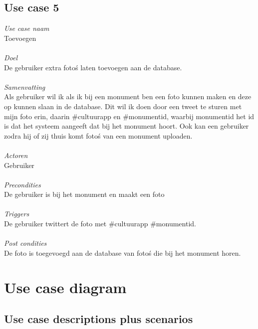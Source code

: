 \documentclass[a4paper,10pt]{article}
\begin{document}
		\subsection{Use case 5}
			\textit{Use case naam}\\
			Toevoegen\\ \\
			\textit{Doel}\\
			De gebruiker extra foto\'s laten toevoegen aan de database.\\ \\
			\textit{Samenvatting}\\
			Als gebruiker wil ik als ik bij een monument ben een foto kunnen maken en deze op kunnen slaan in de database. Dit wil ik doen door een tweet te sturen met mijn foto erin, daarin \#cultuurapp en \#monumentid, waarbij monumentid het id is dat het systeem aangeeft dat bij het monument hoort. Ook kan een gebruiker zodra hij of zij thuis komt foto\'s van een monument uploaden.\\ \\
			\textit{Actoren}\\
			Gebruiker\\ \\
			\textit{Precondities}\\
			De gebruiker is bij het monument en maakt een foto\\ \\
			\textit{Triggers}\\
			De gebruiker twittert de foto met \#cultuurapp \#monumentid.\\ \\
			\textit{Post condities}\\
			De foto is toegevoegd aan de database van foto\'s die bij het monument horen.
			
	\clearpage
	\section{Use case diagram}
		\subsection{Use case descriptions plus scenarios}
\end{document}
